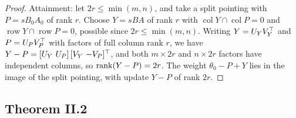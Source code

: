 \begin{proof}
Attainment: let $2r\le\min(m,n)$, and take a split pointing with $P=sB_0A_0$ of rank $r$. Choose $Y=sBA$ of rank $r$ with
$\operatorname{col}Y\cap\operatorname{col}P=0$ and $\operatorname{row}Y\cap\operatorname{row}P=0$, possible since
$2r\le\min(m,n)$. Writing $Y=U_YV_Y^{\top}$ and $P=U_PV_P^{\top}$ with factors of full column rank $r$, we have
$Y-P=[U_Y\ U_P]\,[V_Y\ {-V_P}]\T$, and both $m\times2r$ and $n\times2r$ factors have independent columns, so
$\operatorname{rank}(Y-P)=2r$. The weight $\theta_0-P+Y$ lies in the image of the split pointing, with update $Y-P$ of rank $2r$.
\end{proof}

\subsection{Theorem II.2}\label{proof:II.2}

